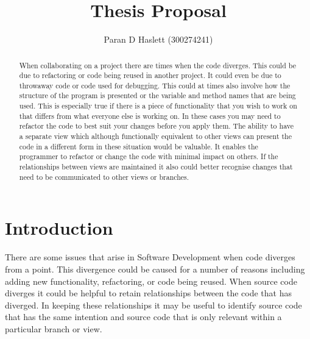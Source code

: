 \documentclass[12pt]{CRPITStyle}
\begin{document}
\title{Thesis Proposal}
\author{Paran D Haslett (300274241)}
\maketitle

\begin{abstract}
When collaborating on a project there are times when the code diverges. This could be due to refactoring or code being reused in another project. It could even be due to throwaway code or code used for debugging. This could at times also involve how the structure of the program is presented or the variable and method names that are being used. This is especially true if there is a piece of functionality that you wish to work on that differs from what everyone else is working on. In these cases you may need to refactor the code to best suit your changes before you apply them. The ability to have a separate view which although functionally equivalent to other views can present the code in a different form in these situation would be valuable. It enables the programmer to refactor or change the code with minimal impact on others. If the relationships between views are maintained it also could better recognise changes that need to be communicated to other views or branches.
\end{abstract}
\vspace{.1in}


\section{Introduction}
There are some issues that arise in Software Development when code diverges from a point. This divergence could be caused for a number of reasons including adding new functionality, refactoring, or code being reused. When source code diverges it could be helpful to retain relationships between the code that has diverged. In keeping these relationships it may be useful to identify source code that has the same intention and source code that is only relevant within a particular branch or view. 
\end{document}
